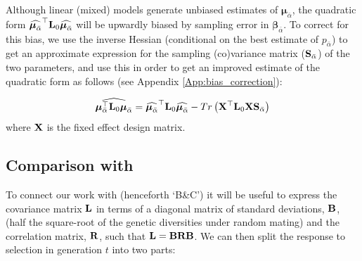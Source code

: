 \documentclass[12pt]{article}
\begin{document}
\begin{bibunit}
Although linear (mixed) models generate unbiased estimates of $\boldsymbol{\mu}_{\bar{\alpha}}$, the quadratic form $\widehat{\boldsymbol{\mu}_{\bar{\alpha}}}^{\top}{\bf L}_0\widehat{\boldsymbol{\mu}_{\bar{\alpha}}}$ will be upwardly biased by sampling error in ${\boldsymbol \beta}_{\bar{\alpha}}$. To correct for this bias, we use the inverse Hessian (conditional on the best estimate of ${p_{\bar{\alpha}}}$) to get an approximate expression for the sampling (co)variance matrix (${\bf S}_{\bar{\alpha}}$) of the two parameters, and use this in order to get an improved estimate of the quadratic form as follows (see Appendix \ref{App:bias_correction}):

\begin{equation} 
\widehat{\boldsymbol{\mu}_{\bar{\alpha}}^{\top}{\bf L}_0\boldsymbol{\mu}_{\bar{\alpha}}}= \widehat{\boldsymbol{\mu}_{\bar{\alpha}}}^{\top}{\bf L}_0\widehat{\boldsymbol{\mu}_{\bar{\alpha}}}-Tr\left({\bf X}^{\top}{\bf L}_0{\bf X}{\bf S}_{\bar{\alpha}}\right)
\end{equation}
where ${\bf X}$ is the fixed effect design matrix.

\subsection*{Comparison with  \citet{buffalo2019linked}}


To connect our work with \citet{buffalo2019linked} (henceforth `B\&C') it will be useful to express the covariance matrix  ${\bf L}$ in terms of a diagonal matrix of standard deviations,  ${\bf B}$, (half the square-root of the genetic diversities under random mating) and the correlation matrix, ${\bf R}$, such that  ${\bf L}={\bf B}{\bf R}{\bf B}$. We can then split the response to selection in generation $t$ into two parts:


\end{bibunit}
\end{document}
